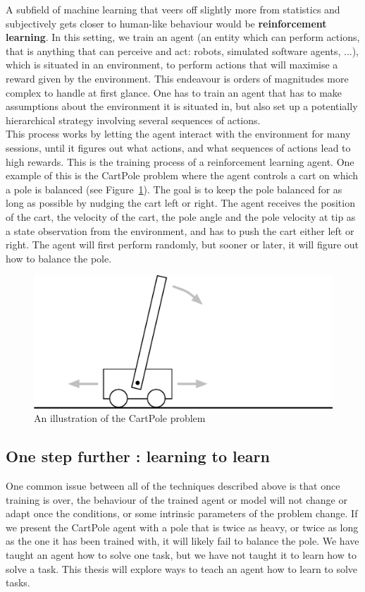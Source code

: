 A subfield of machine learning that veers off slightly more
from statistics and subjectively gets closer to human-like behaviour
would be \textbf{reinforcement learning}. In this setting, we train an agent
(an entity which can perform actions, that is anything that can perceive and
act: robots, simulated software agents, ...), 
which is situated in an environment, to perform actions that will maximise
a reward given by the environment. This endeavour is orders of magnitudes more
complex to handle at first glance. One has to train an agent that has to make
assumptions about the environment it is situated in, but also set up a
potentially hierarchical strategy involving several sequences of actions.\\

This process works by letting the agent interact with the environment for many
sessions, until it figures out what actions, and what sequences of actions lead
to high rewards. This is the training process of a reinforcement learning agent.
One example of this is the CartPole problem \cite{barto-cartpole} where the
agent controls a cart on which a pole is balanced (see
Figure~\ref{fig:cartpole_illustration}). The goal is to keep the
pole balanced for as long as possible by nudging the cart left or right. The
agent receives the position of the cart, the velocity of the cart, the pole
angle and the pole velocity at tip as a state observation from the environment,
and has to push the cart either left or right. The agent will first perform
randomly, but sooner or later, it will figure out how to balance the pole.\\

\begin{figure}
	\centering
	\includegraphics[width=0.8\linewidth]{fig/cartpole.eps}
	\caption{An illustration of the CartPole problem}
	\label{fig:cartpole_illustration}
\end{figure}

\subsection{One step further : learning to learn}
One common issue between all of the techniques described above is that once
training is over, the behaviour of the trained agent or model will not change
or adapt once the conditions, or some intrinsic parameters of the problem
change. If we present the CartPole agent with a pole that is twice as heavy,
or twice as long as the one it has been trained with, it will likely fail to 
balance the pole. We have taught an agent how to solve one task, but we have
not taught it to learn how to solve a task. This thesis will explore ways to 
teach an agent how to learn to solve tasks.\\

